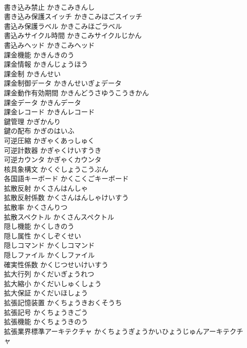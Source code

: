 \documentclass[8pt]{extreport}
\begin{document}
\begin{CJK}{UTF8}{min}
\\	書き込み禁止	かきこみきんし	
\\	書き込み保護スイッチ	かきこみほごスイッチ	
\\	書込み保護ラベル	かきこみほごラベル	
\\	書込みサイクル時間	かきこみサイクルじかん	
\\	書込みヘッド	かきこみヘッド	
\\	課金機能	かきんきのう	
\\	課金情報	かきんじょうほう	
\\	課金制	かきんせい	
\\	課金制御データ	かきんせいぎょデータ	
\\	課金動作有効期間	かきんどうさゆうこうきかん	
\\	課金データ	かきんデータ	
\\	課金レコード	かきんレコード	
\\	鍵管理	かぎかんり	
\\	鍵の配布	かぎのはいふ	
\\	可逆圧縮	かぎゃくあっしゅく	
\\	可逆計数器	かぎゃくけいすうき	
\\	可逆カウンタ	かぎゃくカウンタ	
\\	核具象構文	かくぐしょうこうぶん	
\\	各国語キーボード	かくこくごキーボード	
\\	拡散反射	かくさんはんしゃ	
\\	拡散反射係数	かくさんはんしゃけいすう	
\\	拡散率	かくさんりつ	
\\	拡散スペクトル	かくさんスペクトル	
\\	隠し機能	かくしきのう	
\\	隠し属性	かくしぞくせい	
\\	隠しコマンド	かくしコマンド	
\\	隠しファイル	かくしファイル	
\\	確実性係数	かくじつせいけいすう	
\\	拡大行列	かくだいぎょうれつ	
\\	拡大縮小	かくだいしゅくしょう	
\\	拡大保証	かくだいほしょう	
\\	拡張記憶装置	かくちょうきおくそうち	
\\	拡張記号	かくちょうきごう	
\\	拡張機能	かくちょうきのう	
\\	拡張業界標準アーキテクチャ	かくちょうぎょうかいひょうじゅんアーキテクチャ	

\end{CJK}
\end{document}
